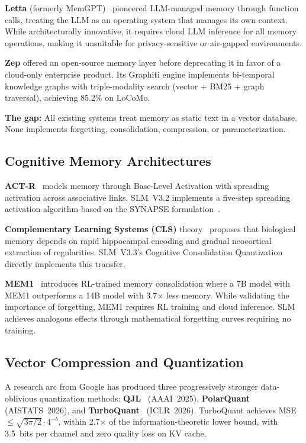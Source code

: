 \textbf{Letta} (formerly MemGPT)~\cite{letta} pioneered LLM-managed memory through function calls, treating the LLM as an operating system that manages its own context. While architecturally innovative, it requires cloud LLM inference for all memory operations, making it unsuitable for privacy-sensitive or air-gapped environments.

\textbf{Zep} offered an open-source memory layer before deprecating it in favor of a cloud-only enterprise product. Its Graphiti engine implements bi-temporal knowledge graphs with triple-modality search (vector + BM25 + graph traversal), achieving 85.2\% on LoCoMo.

\textbf{The gap:} All existing systems treat memory as static text in a vector database. None implements forgetting, consolidation, compression, or parameterization.

\subsection{Cognitive Memory Architectures}

\textbf{ACT-R}~\cite{collins-loftus} models memory through Base-Level Activation with spreading activation across associative links. SLM~V3.2 implements a five-step spreading activation algorithm based on the SYNAPSE formulation~\cite{synapse}.

\textbf{Complementary Learning Systems (CLS)} theory~\cite{cls-theory} proposes that biological memory depends on rapid hippocampal encoding and gradual neocortical extraction of regularities. SLM~V3.3's Cognitive Consolidation Quantization directly implements this transfer.

\textbf{MEM1}~\cite{mem1} introduces RL-trained memory consolidation where a 7B model with MEM1 outperforms a 14B model with 3.7$\times$ less memory. While validating the importance of forgetting, MEM1 requires RL training and cloud inference. SLM achieves analogous effects through mathematical forgetting curves requiring no training.

\subsection{Vector Compression and Quantization}

A research arc from Google has produced three progressively stronger data-oblivious quantization methods: \textbf{QJL}~\cite{qjl} (AAAI~2025), \textbf{PolarQuant}~\cite{polarquant} (AISTATS~2026), and \textbf{TurboQuant}~\cite{turboquant} (ICLR~2026). TurboQuant achieves MSE $\leq \sqrt{3\pi/2} \cdot 4^{-b}$, within 2.7$\times$ of the information-theoretic lower bound, with 3.5~bits per channel and zero quality loss on KV cache.

